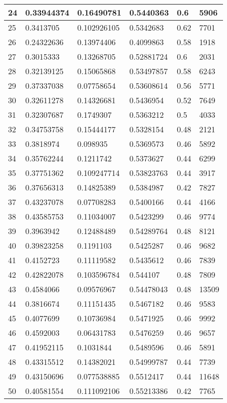 \begin{longtable}{|l|l|l|l|l|l|}
24 & 0.33944374 & 0.16490781 & 0.5440363 & 0.6 & 5906 \\ \hline 
25 & 0.3413705 & 0.102926105 & 0.5342683 & 0.62 & 7701 \\ \hline 
26 & 0.24322636 & 0.13974406 & 0.4099863 & 0.58 & 1918 \\ \hline 
27 & 0.3015333 & 0.13268705 & 0.52881724 & 0.6 & 2031 \\ \hline 
28 & 0.32139125 & 0.15065868 & 0.53497857 & 0.58 & 6243 \\ \hline 
29 & 0.37337038 & 0.07758654 & 0.53608614 & 0.56 & 5771 \\ \hline 
30 & 0.32611278 & 0.14326681 & 0.5436954 & 0.52 & 7649 \\ \hline 
31 & 0.32307687 & 0.1749307 & 0.5363212 & 0.5 & 4033 \\ \hline 
32 & 0.34753758 & 0.15444177 & 0.5328154 & 0.48 & 2121 \\ \hline 
33 & 0.3818974 & 0.098935 & 0.5369573 & 0.46 & 5892 \\ \hline 
34 & 0.35762244 & 0.1211742 & 0.5373627 & 0.44 & 6299 \\ \hline 
35 & 0.37751362 & 0.109247714 & 0.53823763 & 0.44 & 3917 \\ \hline 
36 & 0.37656313 & 0.14825389 & 0.5384987 & 0.42 & 7827 \\ \hline 
37 & 0.43237078 & 0.07708283 & 0.5400166 & 0.44 & 4166 \\ \hline 
38 & 0.43585753 & 0.11034007 & 0.5423299 & 0.46 & 9774 \\ \hline 
39 & 0.3963942 & 0.12488489 & 0.54289764 & 0.48 & 8121 \\ \hline 
40 & 0.39823258 & 0.1191103 & 0.5425287 & 0.46 & 9682 \\ \hline 
41 & 0.4152723 & 0.11119582 & 0.5435612 & 0.46 & 7839 \\ \hline 
42 & 0.42822078 & 0.103596784 & 0.544107 & 0.48 & 7809 \\ \hline 
43 & 0.4584066 & 0.09576967 & 0.54478043 & 0.48 & 13509 \\ \hline 
44 & 0.3816674 & 0.11151435 & 0.5467182 & 0.46 & 9583 \\ \hline 
45 & 0.4077699 & 0.10736984 & 0.5471925 & 0.46 & 9992 \\ \hline 
46 & 0.4592003 & 0.06431783 & 0.5476259 & 0.46 & 9657 \\ \hline 
47 & 0.41952115 & 0.1031844 & 0.5489596 & 0.46 & 5891 \\ \hline 
48 & 0.43315512 & 0.14382021 & 0.54999787 & 0.44 & 7739 \\ \hline 
49 & 0.43150696 & 0.077538885 & 0.5512417 & 0.44 & 11648 \\ \hline 
50 & 0.40581554 & 0.111092106 & 0.55213386 & 0.42 & 7765 \\ \hline 
\end{longtable}